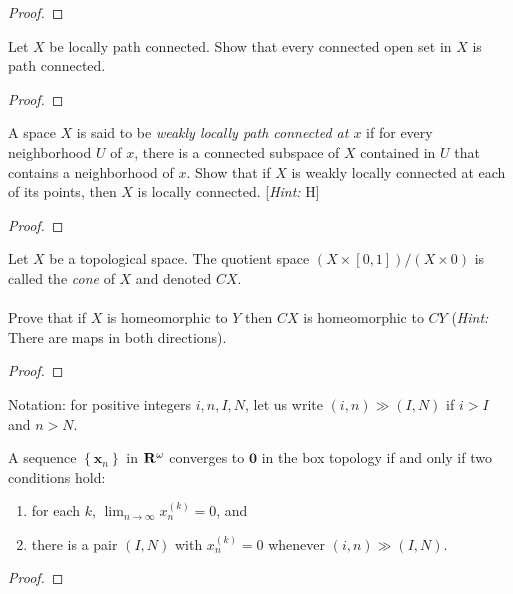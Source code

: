 \begin{proof}
\end{proof}
\newpage
\begin{problem}[Munkres \S25, Ex.\,4]
Let $X$ be locally path connected. Show that every connected open
set in $X$ is path connected.
\end{problem}
\begin{proof}
\end{proof}
\newpage
\begin{problem}[Munkres \S25, Ex.\,6]
A space $X$ is said to be \emph{weakly locally path connected at
  $x$} if for every neighborhood $U$ of $x$, there is a connected
subspace of $X$ contained in $U$ that contains a neighborhood of
$x$. Show that if $X$ is weakly locally connected at each of its
points, then $X$ is locally connected. [\emph{Hint:} H]
\end{problem}
\begin{proof}
\end{proof}
\newpage
\begin{problem}[A]
Let $X$ be a topological space. The quotient space
$(X\times[0,1])/(X\times 0)$ is called the \emph{cone} of $X$ and
denoted $CX$.
\\\\
Prove that if $X$ is homeomorphic to $Y$ then $CX$ is
homeomorphic to $CY$ (\emph{Hint:} There are maps in both
directions).
\end{problem}
\begin{proof}
\end{proof}
\newpage
\begin{problem}
Notation: for positive integers $i,n,I,N$, let us write
$(i,n)\gg(I,N)$ if $i>I$ and $n>N$.
\begin{theorem}
A sequence $\left\{\mathbf{x}_n\right\}$ in $\mathbf{R}^\omega$
converges to $\mathbf{0}$ in the box topology if and only if two
conditions hold:
\begin{enumerate}[noitemsep,label=(\roman*)]
\item for each $k$, $\lim_{n\to\infty} x_n^{(k)}=0$, and
\item there is a pair $(I,N)$ with $x_n^{(k)}=0$ whenever
  $(i,n)\gg(I,N)$.
\end{enumerate}
\end{theorem}
\end{problem}
\begin{proof}
\end{proof}

